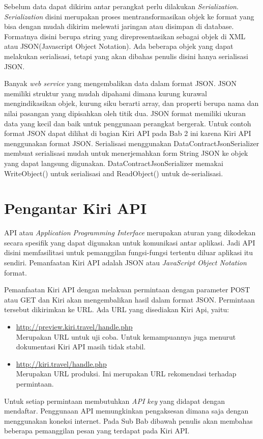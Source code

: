 \hspace{0.5cm} Sebelum data dapat dikirim antar perangkat perlu dilakukan \textit{Serialization}. \textit{Serialization} disini merupakan proses mentransformasikan objek ke format yang bisa dengan mudah dikirim melewati jaringan atau disimpan di database. Formatnya disini berupa string yang direpresentasikan sebagai objek di XML atau JSON(Javascript Object Notation). Ada beberapa objek yang dapat melakukan serialisasi, tetapi yang akan dibahas penulis disini hanya serialisasi JSON. 

\hspace{0.5cm} Banyak \textit{web service} yang mengembalikan data dalam format JSON. JSON memiliki struktur yang mudah dipahami dimana kurung kurawal mengindikasikan objek, kurung siku berarti array, dan properti berupa nama dan nilai pasangan yang dipisahkan oleh titik dua. JSON format memiliki ukuran data yang kecil dan baik untuk penggunaan perangkat bergerak. Untuk contoh format JSON dapat dilihat di bagian Kiri API pada Bab 2 ini karena Kiri API menggunakan format JSON. Serialisasi menggunakan DataContractJsonSerializer membuat serialisasi mudah untuk menerjemahkan form String JSON ke objek yang dapat langsung digunakan. DataContractJsonSerializer memakai WriteObject() untuk serialisasi and ReadObject() untuk de-serialisasi.

\section{Pengantar Kiri API}
\label{sec:Pengantar Kiri API}
\hspace{0.5cm} API atau \textit{Application Programming Interface} merupakan aturan yang dikodekan secara spesifik yang dapat digunakan untuk komunikasi antar aplikasi. Jadi API disini memfasilitasi untuk pemanggilan fungsi-fungsi tertentu diluar aplikasi itu sendiri. Pemanfaatan Kiri API adalah JSON atau \textit{JavaScript Object Notation} format. 

\hspace{0.5cm} Pemanfaatan Kiri API dengan melakuan permintaan dengan parameter POST atau GET dan Kiri akan mengembalikan hasil dalam format JSON. Permintaan tersebut dikirimkan ke URL. Ada URL yang disediakan Kiri Api, yaitu:
\begin{itemize}
	\item \url{http://preview.kiri.travel/handle.php} \\
	Merupakan URL untuk uji coba. Untuk kemampuannya juga menurut dokumentasi Kiri API masih tidak stabil.
	\item \url{http://kiri.travel/handle.php} \\
	Merupakan URL produksi. Ini merupakan URL rekomendasi terhadap permintaan.
\end{itemize}
Untuk setiap permintaan membutuhkan \textit{API key} yang didapat dengan mendaftar\cite{Kiri}. Penggunaan API memungkinkan pengaksesan dimana saja dengan menggunakan koneksi internet. Pada Sub Bab dibawah penulis akan membahas beberapa pemanggilan pesan yang terdapat pada Kiri API.

